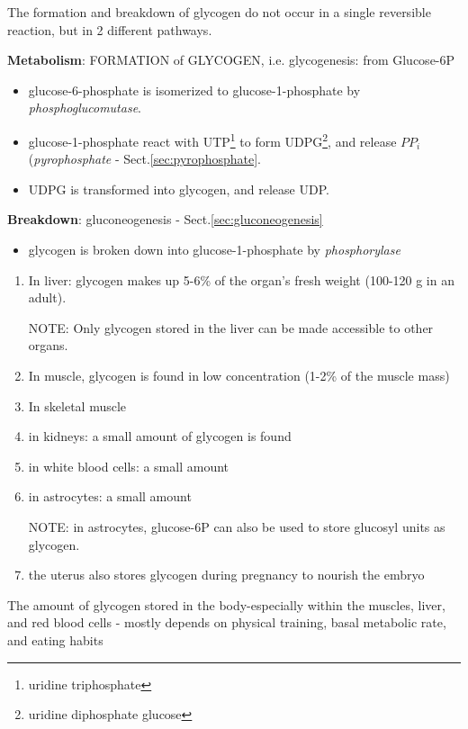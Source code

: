 The formation and breakdown of glycogen do not occur in a single
reversible reaction, but in 2 different pathways.

{\bf Metabolism}: FORMATION of GLYCOGEN, i.e. glycogenesis: from Glucose-6P
\label{sec:glycogenesis}  
\begin{itemize}
  
\item glucose-6-phosphate is isomerized to glucose-1-phosphate by {\it
    phosphoglucomutase}. 

\item glucose-1-phosphate react with
  UTP\footnote{uridine triphosphate} to form
  UDPG\footnote{uridine diphosphate glucose}, and release $PP_i$
  ({\it pyrophosphate} - Sect.\ref{sec:pyrophosphate}.

\item UDPG is transformed into glycogen, and release UDP. 
\end{itemize}

{\bf Breakdown}: gluconeogenesis - Sect.\ref{sec:gluconeogenesis}
\begin{itemize}
\item glycogen is broken down into glucose-1-phosphate by {\it
    phosphorylase} 
\end{itemize}


\begin{enumerate}
  \item In liver: glycogen makes up  5-6\% of the organ's fresh weight (100-120
  g in an adult).

NOTE: Only glycogen stored in the liver can be made accessible to other organs.
  
  \item  In muscle, glycogen is found in low concentration (1-2\% of the muscle
  mass)

  \item In skeletal muscle

  \item in kidneys: a small amount of glycogen is found
    
  \item in white blood cells: a small amount
  
  \item in astrocytes: a small amount 
  
  NOTE: in astrocytes, glucose-6P can also be used to store
glucosyl units as glycogen.
  
  \item the uterus also stores glycogen during pregnancy to nourish the embryo
\end{enumerate}
The amount of glycogen stored in the body-especially within the muscles, liver,
and red blood cells - mostly depends on physical training, basal
metabolic rate, and eating habits 


